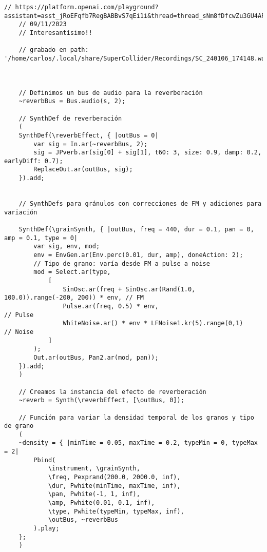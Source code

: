 \begin{minipage}[t]{1\textwidth}
    \centering
\begin{lstlisting}[style=SuperCollider-IDE, basicstyle=\footnotesize\ttfamily, numbers=none]
    // https://platform.openai.com/playground?assistant=asst_jRoEFqfb7RegBABBvS7qEi1i&thread=thread_sNm8fDfcwZu3GU4APA6g3SXp
    // 09/11/2023
    // Interesantísimo!!
    
    // grabado en path: '/home/carlos/.local/share/SuperCollider/Recordings/SC_240106_174148.wav'
    
    
    
    // Definimos un bus de audio para la reverberación
    ~reverbBus = Bus.audio(s, 2);
    
    // SynthDef de reverberación
    (
    SynthDef(\reverbEffect, { |outBus = 0|
        var sig = In.ar(~reverbBus, 2);
        sig = JPverb.ar(sig[0] + sig[1], t60: 3, size: 0.9, damp: 0.2, earlyDiff: 0.7);
        ReplaceOut.ar(outBus, sig);
    }).add;
    
    
    // SynthDefs para gránulos con correcciones de FM y adiciones para variación
    
    SynthDef(\grainSynth, { |outBus, freq = 440, dur = 0.1, pan = 0, amp = 0.1, type = 0|
        var sig, env, mod;
        env = EnvGen.ar(Env.perc(0.01, dur, amp), doneAction: 2);
        // Tipo de grano: varía desde FM a pulse a noise
        mod = Select.ar(type,
            [
                SinOsc.ar(freq + SinOsc.ar(Rand(1.0, 100.0)).range(-200, 200)) * env, // FM
                Pulse.ar(freq, 0.5) * env,                                            // Pulse
                WhiteNoise.ar() * env * LFNoise1.kr(5).range(0,1)                    // Noise
            ]
        );
        Out.ar(outBus, Pan2.ar(mod, pan));
    }).add;
    )
    
    // Creamos la instancia del efecto de reverberación
    ~reverb = Synth(\reverbEffect, [\outBus, 0]);
    
    // Función para variar la densidad temporal de los granos y tipo de grano
    (
    ~density = { |minTime = 0.05, maxTime = 0.2, typeMin = 0, typeMax = 2|
        Pbind(
            \instrument, \grainSynth,
            \freq, Pexprand(200.0, 2000.0, inf),
            \dur, Pwhite(minTime, maxTime, inf),
            \pan, Pwhite(-1, 1, inf),
            \amp, Pwhite(0.01, 0.1, inf),
            \type, Pwhite(typeMin, typeMax, inf),
            \outBus, ~reverbBus
        ).play;
    };
    )
    

\end{lstlisting}
\end{minipage}
